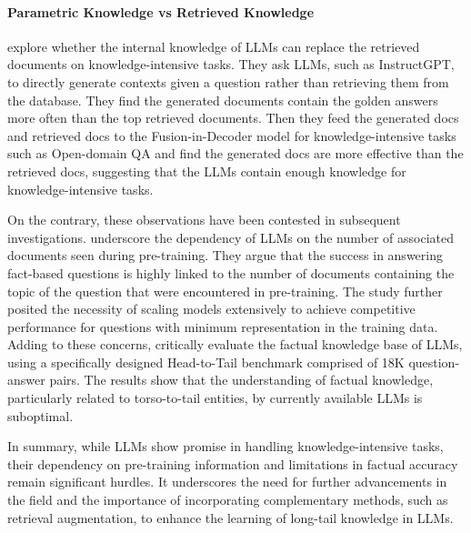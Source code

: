 \paragraph{Parametric Knowledge vs Retrieved Knowledge}
\citet{yu2023generate} explore whether the internal knowledge of LLMs can replace the retrieved documents on knowledge-intensive tasks. They ask LLMs, such as InstructGPT, to directly generate contexts given a question rather than retrieving them from the database. They find the generated documents contain the golden answers more often than the top retrieved documents. Then they feed the generated docs and retrieved docs to the Fusion-in-Decoder model \citep{Fusion-in-Decoder} for knowledge-intensive tasks such as Open-domain QA \citep{NQ} and find the generated docs are more effective than the retrieved docs, suggesting that the LLMs contain enough knowledge for knowledge-intensive tasks.


On the contrary, these observations have been contested in subsequent investigations. \citet{kandpal2023large} underscore the dependency of LLMs on the number of associated documents seen during pre-training. They argue that the success in answering fact-based questions is highly linked to the number of documents containing the topic of the question that were encountered in pre-training. The study further posited the necessity of scaling models extensively to achieve competitive performance for questions with minimum representation in the training data.
Adding to these concerns, \citet{sun2023head} critically evaluate the factual knowledge base of LLMs, using a specifically designed Head-to-Tail benchmark comprised of 18K question-answer pairs. The results show that the understanding of factual knowledge, particularly related to torso-to-tail entities, by currently available LLMs is suboptimal.


In summary, while LLMs show promise in handling knowledge-intensive tasks, their dependency on pre-training information and limitations in factual accuracy remain significant hurdles. It underscores the need for further advancements in the field and the importance of incorporating complementary methods, such as retrieval augmentation, to enhance the learning of long-tail knowledge in LLMs.


 


